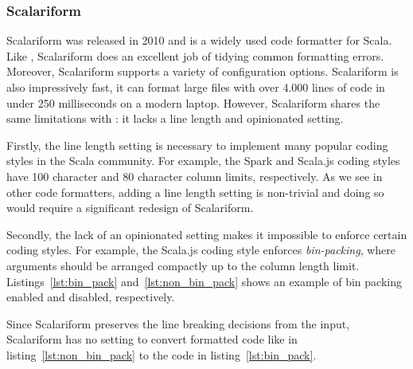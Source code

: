 \subsubsection{Scalariform}
Scalariform\autocite{russell_scalariform_2010} was released in 2010 and is a widely used code formatter for Scala.
Like \gofmt{}, Scalariform does an excellent job of tidying common formatting errors.
Moreover, Scalariform supports a variety of configuration options.
Scalariform is also impressively fast, it can format large files with over 4.000 lines of code in under 250 milliseconds on a modern laptop.
However, Scalariform shares the same limitations with \gofmt{}: it lacks a line length and opinionated setting.

Firstly, the line length setting is necessary to implement many popular coding styles in the Scala community.
For example, the Spark\autocite{xin_spark_2015} and Scala.js\autocite{doeraene_scala.js_2015} coding styles have 100 character and 80 character column limits, respectively.
As we see in other code formatters, adding a line length setting is non-trivial and doing so would require a significant redesign of Scalariform.

Secondly, the lack of an opinionated setting makes it impossible to enforce certain coding styles.
For example, the Scala.js coding style enforces \emph{bin-packing}, where arguments should be arranged compactly up to the column length limit.
Listings~\ref{lst:bin_pack} and~\ref{lst:non_bin_pack} shows an example of bin packing enabled and disabled, respectively.

\begin{minipage}{.45\textwidth}
  
\end{minipage}
\hfil
\begin{minipage}{.45\textwidth}
  
\end{minipage}

Since Scalariform preserves the line breaking decisions from the input,
Scalariform has no setting to convert formatted code like in listing~\ref{lst:non_bin_pack} to the code in listing~\ref{lst:bin_pack}.

